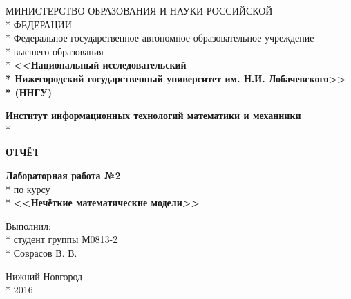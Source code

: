 \begin{titlepage}

\begin{center}
\fontsize{16pt}{16pt}МИНИСТЕРСТВО ОБРАЗОВАНИЯ И НАУКИ РОССИЙСКОЙ\\*
ФЕДЕРАЦИИ \\*
\fontsize{16pt}{0pt}Федеральное государственное автономное образовательное учреждение\\*
высшего образования \\*
\fontsize{16pt}{16pt}\textbf{<<Национальный исследовательский \\*
Нижегородский государственный университет им. Н.И. Лобачевского>>\\*
(ННГУ)}
\end{center}

\vspace{12pt}

\begin{center}
\fontsize{16pt}{0pt}\textbf{Институт информационных технологий математики и механники} \\*
\end{center}

\vspace{50pt}

\vspace{45pt}

\begin{center}
\fontsize{18pt}{0pt}\textbf{ОТЧЁТ}
\end{center}

\begin{center}
\fontsize{16pt}{0pt}\textbf{Лабораторная работа №2} \\*
по курсу \\*
\textbf{<<Нечёткие математические модели>>}
\end{center}

\vspace{80pt}

\begin{flushright}
Выполнил:  \\*
студент группы М0813-2  \\*
Соврасов В. В. 
\end{flushright}


\vspace{\fill}

\begin{center}
Нижний Новгород \\*
2016
\end{center}

\end{titlepage}

